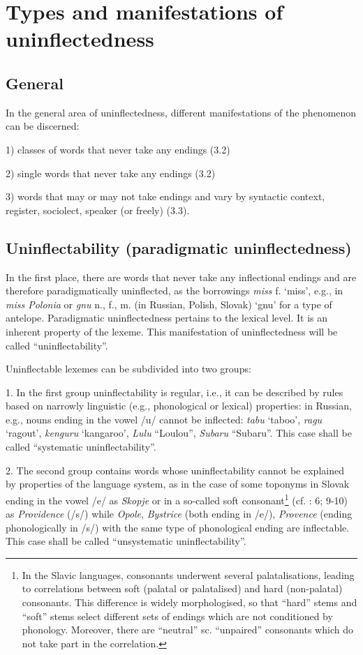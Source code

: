 \documentclass[output=paper]{langscibook}
\begin{document}
\section{Types and manifestations of uninflectedness} %
\subsection{General} %

In the general area of uninflectedness, different manifestations of the phenomenon can be discerned:

1) classes of words that never take any endings (3.2)

2) single words that never take any endings (3.2)

3) words that may or may not take endings and vary by syntactic context, register, sociolect, speaker (or freely) (3.3).

\subsection{Uninflectability (paradigmatic uninflectedness)} %

In the first place, there are words that never take any inflectional endings and are therefore paradigmatically uninflected, as the borrowings \textit{miss} f. ‘miss’, e.g., in \textit{miss Polonia} or \textit{gnu} n., f., m. (in Russian, Polish, Slovak) ‘gnu’ for a type of antelope. Paradigmatic uninflectedness pertains to the lexical level. It is an inherent property of the lexeme. This manifestation of uninflectedness will be called “uninflectability”.

Uninflectable lexemes can be subdivided into two groups: 

1. In the first group uninflectability is regular, i.e., it can be described by rules based on narrowly linguistic (e.g., phonological or lexical) properties: in Russian, e.g., nouns ending in the vowel /u/ cannot be inflected: \textit{tabu} ‘taboo’, \textit{ragu} ‘ragout’, \textit{kenguru} ‘kangaroo’, \textit{Lulu} “Loulou”, \textit{Subaru} “Subaru”. This case shall be called “systematic uninflectability”.

2. The second group contains words whose uninflectability cannot be explained by properties of the language system, as in the case of some toponyms in Slovak ending in the vowel /e/ as \textit{Skopje} or in a so-called soft consonant\footnote{\textrm{In the Slavic languages, consonants underwent several palatalisations, leading to correlations between soft (palatal or palatalised) and hard (non-palatal) consonants. This difference is widely morphologised, so that “hard” stems and “soft” stems select different sets of endings which are not conditioned by phonology. Moreover, there are “neutral” sc. “unpaired” consonants which do not take part in the correlation.}} (cf. \citealt{ComrieCorbett1993}: 6; 9-10) as \textit{Providence} (/s/) while \textit{Opole}, \textit{Bystrice} (both ending in /e/), \textit{Provence} (ending phonologically in /s/) with the same type of phonological ending are inflectable. This case shall be called “unsystematic uninflectability”.
\end{document}
